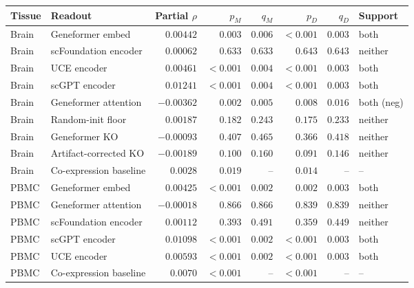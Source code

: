 \begin{tabular}{llrrrrrl}
\toprule
Tissue & Readout & Partial $\rho$ & $p_M$ & $q_M$ & $p_D$ & $q_D$ & Support \\ 
\midrule
Brain & Geneformer embed & $0.00442$ & $0.003$ & $0.006$ & $<0.001$ & $0.003$ & both \\
Brain & scFoundation encoder & $0.00062$ & $0.633$ & $0.633$ & $0.643$ & $0.643$ & neither \\
Brain & UCE encoder & $0.00461$ & $<0.001$ & $0.004$ & $<0.001$ & $0.003$ & both \\
Brain & scGPT encoder & $0.01241$ & $<0.001$ & $0.004$ & $<0.001$ & $0.003$ & both \\
Brain & Geneformer attention & $-0.00362$ & $0.002$ & $0.005$ & $0.008$ & $0.016$ & both (neg) \\
Brain & Random-init floor & $0.00187$ & $0.182$ & $0.243$ & $0.175$ & $0.233$ & neither \\
Brain & Geneformer KO & $-0.00093$ & $0.407$ & $0.465$ & $0.366$ & $0.418$ & neither \\
Brain & Artifact-corrected KO & $-0.00189$ & $0.100$ & $0.160$ & $0.091$ & $0.146$ & neither \\
Brain & Co-expression baseline & $0.0028$ & $0.019$ & -- & $0.014$ & -- & -- \\
PBMC & Geneformer embed & $0.00425$ & $<0.001$ & $0.002$ & $0.002$ & $0.003$ & both \\
PBMC & Geneformer attention & $-0.00018$ & $0.866$ & $0.866$ & $0.839$ & $0.839$ & neither \\
PBMC & scFoundation encoder & $0.00112$ & $0.393$ & $0.491$ & $0.359$ & $0.449$ & neither \\
PBMC & scGPT encoder & $0.01098$ & $<0.001$ & $0.002$ & $<0.001$ & $0.003$ & both \\
PBMC & UCE encoder & $0.00593$ & $<0.001$ & $0.002$ & $<0.001$ & $0.003$ & both \\
PBMC & Co-expression baseline & $0.0070$ & $<0.001$ & -- & $<0.001$ & -- & -- \\
\bottomrule
\end{tabular}
